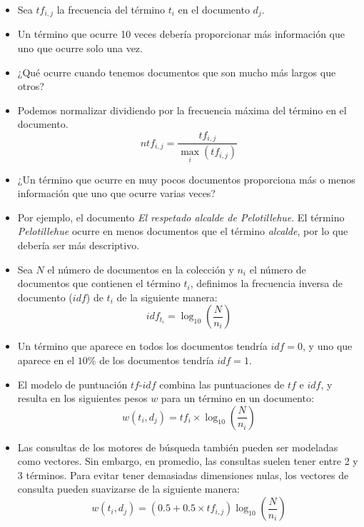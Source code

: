 \begin{itemize}
\item Sea $tf_{i,j}$ la frecuencia del término $t_{i}$ en el documento $d_{j}$.
\item Un término que ocurre 10 veces debería proporcionar más información que uno que ocurre solo una vez.
\item ¿Qué ocurre cuando tenemos documentos que son mucho más largos que otros?
\item Podemos normalizar dividiendo por la frecuencia máxima del término en el documento.
\begin{displaymath}
ntf_{i,j}=\frac{tf_{i,j}}{\max_i (tf_{i,j})}
\end{displaymath}
\item ¿Un término que ocurre en muy pocos documentos proporciona más o menos información que uno que ocurre varias veces?
\item Por ejemplo, el documento \emph{El respetado alcalde de Pelotillehue}. El término \emph{Pelotillehue} ocurre en menos documentos que el término \emph{alcalde}, por lo que debería ser más descriptivo.
\item Sea $N$ el número de documentos en la colección y $n_{i}$ el número de documentos que contienen el término $t_{i}$, definimos la frecuencia inversa de documento ($idf$) de $t_{i}$ de la siguiente manera:
\begin{displaymath}
idf_{t_{i}}= \log_{10}\left(\frac{N}{n_{i}}\right)
\end{displaymath}
\item Un término que aparece en todos los documentos tendría $idf=0$, y uno que aparece en el $10\%$ de los documentos tendría $idf=1$.
\item El modelo de puntuación $tf$-$idf$ combina las puntuaciones de $tf$ e $idf$, y resulta en los siguientes pesos $w$ para un término en un documento:
\begin{displaymath}
w(t_{i},d_{j})=tf_{i}\times \log_{10}\left(\frac{N}{n_{i}}\right)
\end{displaymath}
\item Las consultas de los motores de búsqueda también pueden ser modeladas como vectores. Sin embargo, en promedio, las consultas suelen tener entre 2 y 3 términos. Para evitar tener demasiadas dimensiones nulas, los vectores de consulta pueden suavizarse de la siguiente manera:
\begin{displaymath}
w(t_{i},d_{j})=(0.5+0.5\times tf_{i,j})\log_{10}\left(\frac{N}{n_{i}}\right)
\end{displaymath}
\end{itemize}

